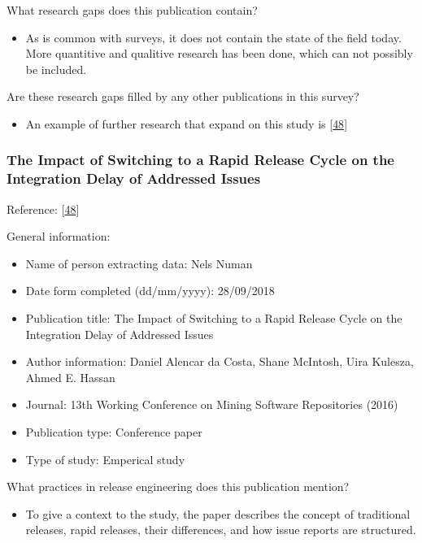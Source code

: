 \documentclass[]{book}
\providecommand{\tightlist}{%
  \setlength{\itemsep}{0pt}\setlength{\parskip}{0pt}}
\begin{document}
What research gaps does this publication contain?

\begin{itemize}
\tightlist
\item
  As is common with surveys, it does not contain the state of the field
  today. More quantitive and qualitive research has been done, which can
  not possibly be included.
\end{itemize}

Are these research gaps filled by any other publications in this survey?

\begin{itemize}
\tightlist
\item
  An example of further research that expand on this study is
  {[}\protect\hyperlink{ref-da2016a}{48}{]}
\end{itemize}

\subsubsection{The Impact of Switching to a Rapid Release Cycle on the
Integration Delay of Addressed
Issues}\label{the-impact-of-switching-to-a-rapid-release-cycle-on-the-integration-delay-of-addressed-issues}

Reference: {[}\protect\hyperlink{ref-da2016a}{48}{]}

General information:

\begin{itemize}
\tightlist
\item
  Name of person extracting data: Nels Numan
\item
  Date form completed (dd/mm/yyyy): 28/09/2018
\item
  Publication title: The Impact of Switching to a Rapid Release Cycle on
  the Integration Delay of Addressed Issues
\item
  Author information: Daniel Alencar da Costa, Shane McIntosh, Uira
  Kulesza, Ahmed E. Hassan
\item
  Journal: 13th Working Conference on Mining Software Repositories
  (2016)
\item
  Publication type: Conference paper
\item
  Type of study: Emperical study
\end{itemize}

What practices in release engineering does this publication mention?

\begin{itemize}
\tightlist
\item
  To give a context to the study, the paper describes the concept of
  traditional releases, rapid releases, their differences, and how issue
  reports are structured.
\end{itemize}
\end{document}
